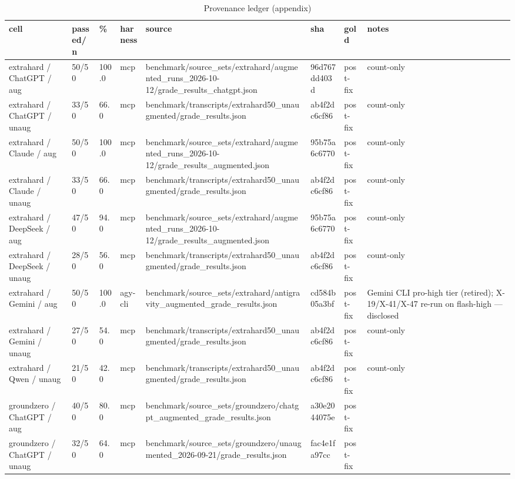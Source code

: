 \begin{table}[t]\centering\small\caption{Provenance ledger (appendix)}\label{tab:prov}
\begin{tabular}{llllllll}
\toprule
cell & passed/n & \% & harness & source & sha & gold & notes \\
\midrule
extrahard / ChatGPT / aug & 50/50 & 100.0 & mcp & benchmark/source\_sets/extrahard/augmented\_runs\_2026-10-12/grade\_results\_chatgpt.json & 96d767dd403d & post-fix & count-only \\
extrahard / ChatGPT / unaug & 33/50 & 66.0 & mcp & benchmark/transcripts/extrahard50\_unaugmented/grade\_results.json & ab4f2dc6cf86 & post-fix & count-only \\
extrahard / Claude / aug & 50/50 & 100.0 & mcp & benchmark/source\_sets/extrahard/augmented\_runs\_2026-10-12/grade\_results\_augmented.json & 95b75a6c6770 & post-fix & count-only \\
extrahard / Claude / unaug & 33/50 & 66.0 & mcp & benchmark/transcripts/extrahard50\_unaugmented/grade\_results.json & ab4f2dc6cf86 & post-fix & count-only \\
extrahard / DeepSeek / aug & 47/50 & 94.0 & mcp & benchmark/source\_sets/extrahard/augmented\_runs\_2026-10-12/grade\_results\_augmented.json & 95b75a6c6770 & post-fix & count-only \\
extrahard / DeepSeek / unaug & 28/50 & 56.0 & mcp & benchmark/transcripts/extrahard50\_unaugmented/grade\_results.json & ab4f2dc6cf86 & post-fix & count-only \\
extrahard / Gemini / aug & 50/50 & 100.0 & agy-cli & benchmark/source\_sets/extrahard/antigravity\_augmented\_grade\_results.json & cd584b05a3bf & post-fix & Gemini CLI pro-high tier (retired); X-19/X-41/X-47 re-run on flash-high — disclosed \\
extrahard / Gemini / unaug & 27/50 & 54.0 & mcp & benchmark/transcripts/extrahard50\_unaugmented/grade\_results.json & ab4f2dc6cf86 & post-fix & count-only \\
extrahard / Qwen / unaug & 21/50 & 42.0 & mcp & benchmark/transcripts/extrahard50\_unaugmented/grade\_results.json & ab4f2dc6cf86 & post-fix & count-only \\
groundzero / ChatGPT / aug & 40/50 & 80.0 & mcp & benchmark/source\_sets/groundzero/chatgpt\_augmented\_grade\_results.json & a30e2044075e & post-fix &  \\
groundzero / ChatGPT / unaug & 32/50 & 64.0 & mcp & benchmark/source\_sets/groundzero/unaugmented\_2026-09-21/grade\_results.json & fac4e1fa97cc & post-fix &  \\

\end{tabular}
\end{table}
